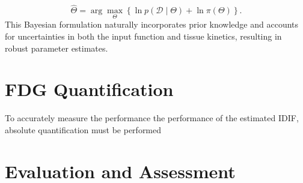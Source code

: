 \begin{equation}
	\hat{\Theta}
	=
	\arg\max_{\Theta}
	\left\{
	\ln p(\mathcal{D} \mid \Theta)
	+
	\ln \pi(\Theta)
	\right\}.
\end{equation}
This Bayesian formulation naturally incorporates prior knowledge and accounts for uncertainties in both the input function and tissue kinetics, resulting in robust parameter estimates.
%

\section{FDG Quantification}
To accurately measure the performance the performance of the estimated IDIF, absolute quantification must be performed 
\section{Evaluation and Assessment}
